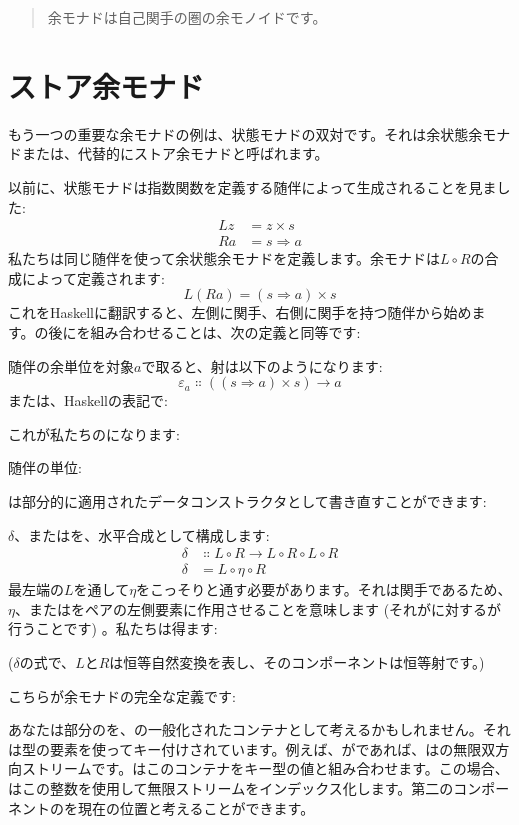 \begin{quote}
  余モナドは自己関手の圏の余モノイドです。
\end{quote}

\section{ストア余モナド}

もう一つの重要な余モナドの例は、状態モナドの双対です。それは余状態余モナドまたは、代替的にストア余モナドと呼ばれます。

以前に、状態モナドは指数関数を定義する随伴によって生成されることを見ました: 
\begin{align*}
  L z & = z\times{}s      \\
  R a & = s \Rightarrow a
\end{align*}
私たちは同じ随伴を使って余状態余モナドを定義します。余モナドは$L \circ R$の合成によって定義されます: 
\[L (R a) = (s \Rightarrow a)\times{}s\]
これをHaskellに翻訳すると、左側に関手、右側に関手を持つ随伴から始めます。の後にを組み合わせることは、次の定義と同等です: 

随伴の余単位を対象$a$で取ると、射は以下のようになります: 
\[\varepsilon_a \Colon ((s \Rightarrow a)\times{}s) \to a\]
または、Haskellの表記で: 

これが私たちのになります: 

随伴の単位: 

は部分的に適用されたデータコンストラクタとして書き直すことができます: 

$\delta$、またはを、水平合成として構成します: 
\begin{align*}
  \delta & \Colon L \circ R \to L \circ R \circ L \circ R \\
  \delta & = L \circ \eta \circ R
\end{align*}
最左端の$L$を通して$\eta$をこっそりと通す必要があります。それは関手であるため、$\eta$、またはをペアの左側要素に作用させることを意味します (それがに対するが行うことです) 。私たちは得ます: 

 ($\delta$の式で、$L$と$R$は恒等自然変換を表し、そのコンポーネントは恒等射です。) 

こちらが余モナドの完全な定義です: 

あなたは部分のを、の一般化されたコンテナとして考えるかもしれません。それは型の要素を使ってキー付けされています。例えば、がであれば、はの無限双方向ストリームです。はこのコンテナをキー型の値と組み合わせます。この場合、はこの整数を使用して無限ストリームをインデックス化します。第二のコンポーネントのを現在の位置と考えることができます。

